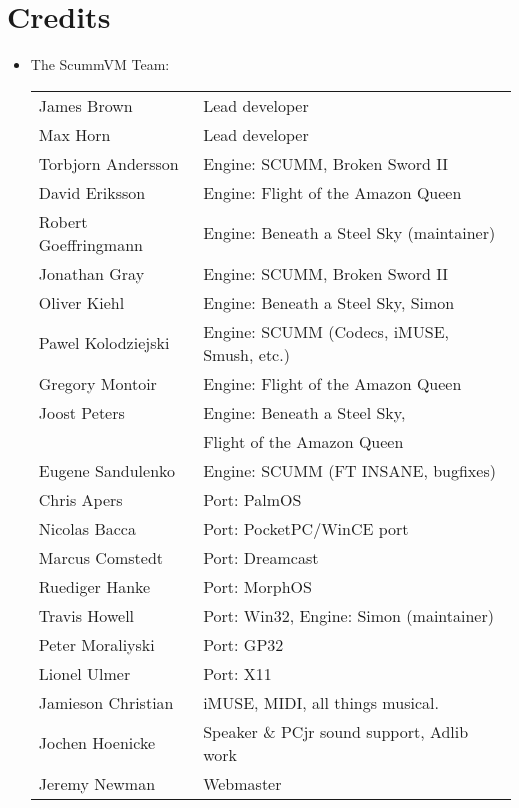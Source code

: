 

\section{Credits}
\begin{itemize}
\item The ScummVM Team:\\
  \begin{tabular}[h]{ll}
    James Brown          & Lead developer\\
    Max Horn             & Lead developer\\
    Torbjorn Andersson   & Engine: SCUMM, Broken Sword II\\
    David Eriksson       & Engine: Flight of the Amazon Queen\\
    Robert Goeffringmann & Engine: Beneath a Steel Sky (maintainer)\\
    Jonathan Gray        & Engine: SCUMM, Broken Sword II\\
    Oliver Kiehl         & Engine: Beneath a Steel Sky, Simon\\
    Pawel Kolodziejski   & Engine: SCUMM (Codecs, iMUSE, Smush, etc.)\\
    Gregory Montoir      & Engine: Flight of the Amazon Queen\\
    Joost Peters         & Engine: Beneath a Steel Sky,\\
                         &         Flight of the Amazon Queen\\
    Eugene Sandulenko    & Engine: SCUMM (FT INSANE, bugfixes)\\
    Chris Apers          & Port: PalmOS\\
    Nicolas Bacca        & Port: PocketPC/WinCE port\\
    Marcus Comstedt      & Port: Dreamcast\\
    Ruediger Hanke       & Port: MorphOS\\
    Travis Howell        & Port: Win32, Engine: Simon (maintainer)\\
    Peter Moraliyski     & Port: GP32\\
    Lionel Ulmer         & Port: X11\\
    Jamieson Christian   & iMUSE, MIDI, all things musical.\\
    Jochen Hoenicke      & Speaker \& PCjr sound support, Adlib work\\
    Jeremy Newman        & Webmaster\\

\end{tabular}
\end{itemize}
